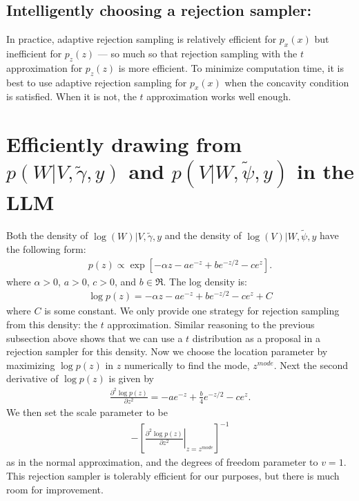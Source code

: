 \documentclass{article}
\begin{document}
\subsection{Intelligently choosing a rejection sampler:}
In practice, adaptive rejection sampling is relatively efficient for $p_x(x)$ but inefficient for $p_z(z)$ --- so much so that rejection sampling with the $t$ approximation for $p_z(z)$ is more efficient. To minimize computation time, it is best to use adaptive rejection sampling for $p_x(x)$ when the concavity condition is satisfied. When it is not, the $t$ approximation works well enough.

\section{Efficiently drawing from $p(W|V,\tilde{\gamma},y)$ and $p(V|W,\tilde{\psi},y)$ in the LLM}\label{sec:wscale}

Both the density of $\log(W)|V,\tilde{\gamma},y$ and the density of $\log(V)|W,\tilde{\psi},y$ have the following form:
\begin{align*}
  p(z)\propto \exp\left[-\alpha z - ae^{-z} + be^{-z/2} - ce^z\right].
\end{align*}
where $\alpha>0$, $a>0$, $c>0$, and $b\in \Re$. The log density is:
\begin{align*}
  \log p(z) = -\alpha z - ae^{-z} + be^{-z/2} - ce^z + C
\end{align*}
where $C$ is some constant. We only provide one strategy for rejection sampling from this density: the $t$ approximation. Similar reasoning to the previous subsection above shows that we can use a $t$ distribution as a proposal in a rejection sampler for this density. Now we choose the location parameter by maximizing $\log p(z)$ in $z$ numerically to find the mode, $z^{mode}$. Next the second derivative of $\log p(z)$ is given by
\begin{align*}
  \frac{\partial^2 \log p(z)}{\partial z^2} = -ae^{-z} + \frac{b}{4}e^{-z/2}-ce^z.
\end{align*}
We then set the scale parameter to be
\begin{align*}
  -\left[\left.\frac{\partial^2 \log p(z)}{\partial z^2}\right|_{z=z^{mode}}\right]^{-1}
\end{align*}
as in the normal approximation, and the degrees of freedom parameter to $v=1$. This rejection sampler is tolerably efficient for our purposes, but there is much room for improvement.
\end{document}
